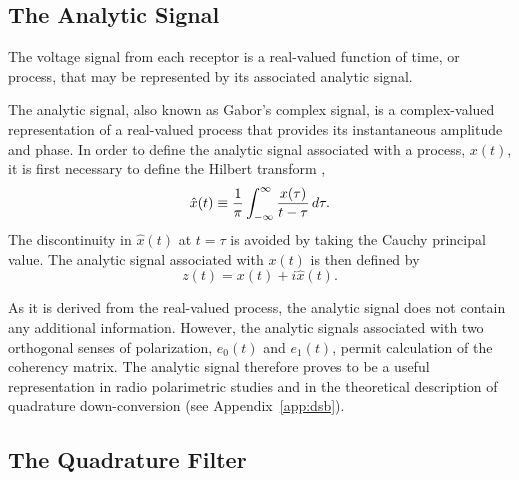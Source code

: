 \documentclass[twocolumn]{aastex6}
\newcommand{\App}[1]{Appendix~\ref{app:#1}}
\newcommand{\Ci}{\ensuremath{i}}
\begin{document}
\begin{appendix}

\section{The Analytic Signal}
\label{app:analytic}

The voltage signal from each receptor is a real-valued function of
time, or process, that may be represented by its associated analytic
signal.

The analytic signal, also known as Gabor's complex signal, is a
complex-valued representation of a real-valued process that provides
its instantaneous amplitude and phase.  In order to define the
analytic signal associated with a process, $x(t)$, it is first
necessary to define the Hilbert transform \citep{pap65},
\begin{equation}
  \hat x(t) \equiv
	{1\over\pi} \int_{-\infty}^\infty {x(\tau)\over t-\tau} \,d\tau.
\label{eqn:hilbert}
\end{equation}
The discontinuity in $\hat x(t)$ at $t=\tau$ is avoided by taking the
Cauchy principal value.
The analytic signal associated with $x(t)$ is then defined by
\begin{equation}
  z(t) = x(t) + \Ci\hat x(t).
\end{equation}

As it is derived from the real-valued process, the analytic signal
does not contain any additional information.  However, the analytic
signals associated with two orthogonal senses of polarization, $e_0(t)$ and
$e_1(t)$, permit calculation of the coherency matrix.  The analytic signal
therefore proves to be a useful representation in radio polarimetric
studies and in the theoretical description of quadrature
down-conversion (see \App{dsb}).

\subsection{The Quadrature Filter}
\label{app:quadrature_filter}


\end{appendix}
\end{document}
